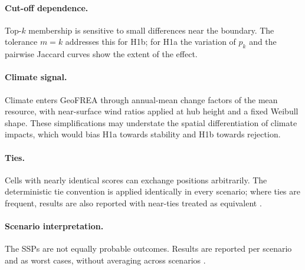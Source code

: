 \paragraph{Cut-off dependence.}
Top-$k$ membership is sensitive to small differences near the boundary. The
tolerance $m=k$ addresses this for H1b; for H1a the variation of $p_k$ and the
pairwise Jaccard curves show the extent of the effect.

\paragraph{Climate signal.}
Climate enters GeoFREA through annual-mean change factors of the mean resource,
with near-surface wind ratios applied at hub height and a fixed Weibull shape.
These simplifications may understate the spatial differentiation of climate
impacts, which would bias H1a towards stability and H1b towards rejection.

\paragraph{Ties.}
Cells with nearly identical scores can exchange positions arbitrarily. The
deterministic tie convention is applied identically in every scenario; where
ties are frequent, results are also reported with near-ties treated as
equivalent \cite{corsi2024}. %

\paragraph{Scenario interpretation.}
The SSPs are not equally probable outcomes. Results are reported per scenario
and as worst cases, without averaging across scenarios
\cite{marchau2019,kwakkel2016}.
